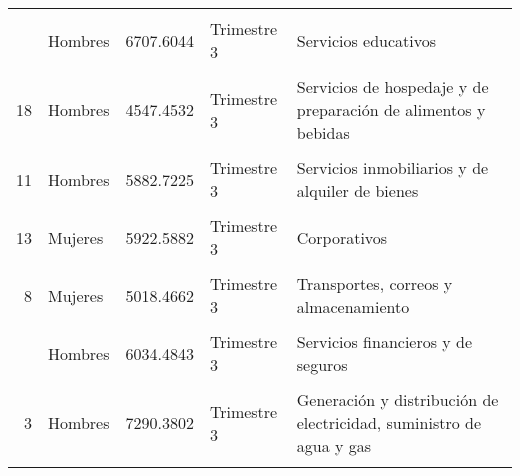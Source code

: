 \documentclass{article}
\begin{document}
\begin{table}[!h]
\begin{tabular}{rlrll}
\cellcolor{gray!10}{1} & \cellcolor{gray!10}{Hombres} & \cellcolor{gray!10}{2448.7417} & \cellcolor{gray!10}{Trimestre 3} & \cellcolor{gray!10}{Agricultura, ganadería, aprovechamiento forestal, pesca y caza}\\
\addlinespace
15 & Hombres & 6707.6044 & Trimestre 3 & Servicios educativos\\
\cellcolor{gray!10}{20} & \cellcolor{gray!10}{Hombres} & \cellcolor{gray!10}{6892.5902} & \cellcolor{gray!10}{Trimestre 3} & \cellcolor{gray!10}{Actividades gubernamentales y de organismos internacionales}\\
18 & Hombres & 4547.4532 & Trimestre 3 & Servicios de hospedaje y de preparación de alimentos y bebidas\\
\cellcolor{gray!10}{16} & \cellcolor{gray!10}{Hombres} & \cellcolor{gray!10}{6771.3071} & \cellcolor{gray!10}{Trimestre 3} & \cellcolor{gray!10}{Servicios de salud y de asistencia social}\\
11 & Hombres & 5882.7225 & Trimestre 3 & Servicios inmobiliarios y de alquiler de bienes\\
\addlinespace
\cellcolor{gray!10}{4} & \cellcolor{gray!10}{Mujeres} & \cellcolor{gray!10}{5920.8470} & \cellcolor{gray!10}{Trimestre 3} & \cellcolor{gray!10}{Construcción}\\
13 & Mujeres & 5922.5882 & Trimestre 3 & Corporativos\\
\cellcolor{gray!10}{9} & \cellcolor{gray!10}{Hombres} & \cellcolor{gray!10}{5590.3657} & \cellcolor{gray!10}{Trimestre 3} & \cellcolor{gray!10}{Información en medios masivos}\\
8 & Mujeres & 5018.4662 & Trimestre 3 & Transportes, correos y almacenamiento\\
\cellcolor{gray!10}{9} & \cellcolor{gray!10}{Mujeres} & \cellcolor{gray!10}{5019.1260} & \cellcolor{gray!10}{Trimestre 3} & \cellcolor{gray!10}{Información en medios masivos}\\
\addlinespace
10 & Hombres & 6034.4843 & Trimestre 3 & Servicios financieros y de seguros\\
\cellcolor{gray!10}{17} & \cellcolor{gray!10}{Mujeres} & \cellcolor{gray!10}{4122.6585} & \cellcolor{gray!10}{Trimestre 3} & \cellcolor{gray!10}{Servicios de esparcimiento, culturales y deportivos}\\
3 & Hombres & 7290.3802 & Trimestre 3 & Generación y distribución de electricidad, suministro de agua y gas\\
\cellcolor{gray!10}{3} & \cellcolor{gray!10}{Mujeres} & \cellcolor{gray!10}{6648.4604} & \cellcolor{gray!10}{Trimestre 3} & \cellcolor{gray!10}{Generación y distribución de electricidad, suministro de agua y gas}\\

\end{tabular}
\end{table}
\end{document}
